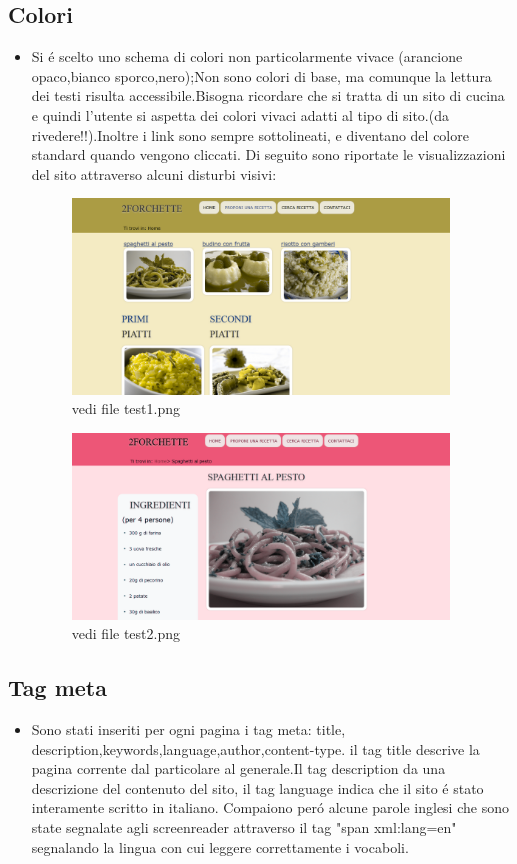 \documentclass[12pt]{article}
\begin{document}
			\subsection{Colori}
			\begin{itemize}
				\item Si \'e scelto uno schema di colori non particolarmente vivace (arancione opaco,bianco sporco,nero);Non sono colori di base, ma comunque la lettura dei testi risulta accessibile.Bisogna ricordare che si tratta di un sito di cucina e quindi l'utente si aspetta dei colori vivaci adatti al tipo di sito.(da rivedere!!).Inoltre i link sono sempre sottolineati, e diventano del colore standard quando vengono cliccati.
				Di seguito sono riportate le visualizzazioni del sito attraverso alcuni disturbi visivi:
				
			
			\begin{figure}[ht!]
				\centering
				\includegraphics[width=100mm]{test1}
				\caption{vedi file test1.png}
			\end{figure}

				\begin{figure}[ht!]
					\centering
					\includegraphics[width=100mm]{test2}					\caption{vedi file test2.png}
				\end{figure}
			\end{itemize}
			\subsection{Tag meta}
			\begin{itemize}
				\item Sono stati inseriti per ogni pagina i tag meta: title, description,keywords,language,author,content-type.
				il tag title descrive la pagina corrente dal particolare al generale.Il tag description da una descrizione del contenuto del sito, il tag language indica che il sito \'e stato interamente scritto in italiano. Compaiono per\'o alcune parole inglesi che sono state segnalate agli screenreader attraverso il tag "span xml:lang=en" segnalando la lingua con cui leggere correttamente i vocaboli. 
			\end{itemize}
\end{document}

